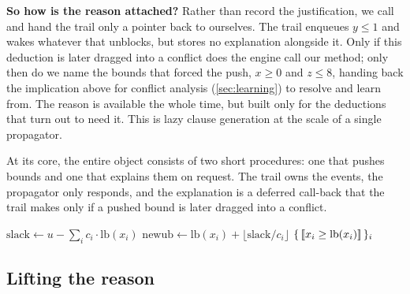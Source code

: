 \textbf{So how is the reason attached?} Rather than record the justification, we
call  and hand the trail
only a pointer back to ourselves. The trail enqueues $y \le 1$ and wakes whatever
that unblocks, but stores no explanation alongside it. Only if this deduction is
later dragged into a conflict does the engine call our  method; only then do we name the bounds that forced the push,
$x \ge 0$ and $z \le 8$, handing back the implication above for conflict analysis
(\cref{sec:learning}) to resolve and learn from. The reason is available the
whole time, but built only for the deductions that turn out to need it. This is lazy
clause generation at the scale of a single propagator.

At its core, the entire object consists of two short
procedures: one that pushes bounds and one that explains them on request. The
trail owns the events, the propagator only responds, and the explanation is a
deferred call-back that the trail makes only if a pushed bound is later dragged
into a conflict.

\begin{algorithm}[htbp]
\caption{Linear propagator for $\sum_i c_i x_i \le u$ in canonical form (all $c_i > 0$)}
\label{alg:linprop}
\begin{algorithmic}[1]
 
  \State $\text{slack} \gets u - \sum_i c_i \cdot \text{lb}(x_i)$ 
    \State \Return {} 
  \EndIf
    \State $\text{newub} \gets \text{lb}(x_i) + \lfloor \text{slack}/c_i \rfloor$
      \State {}
    \EndIf
  \EndFor
\EndProcedure
\Statex
{} 
  \State \Return $\{\, [\![x_i \ge \text{lb}(x_i)]\!] \,\}_i$ 
\EndProcedure
\end{algorithmic}
\end{algorithm}

\subsection{Lifting the reason}\label{sec:relaxation}

